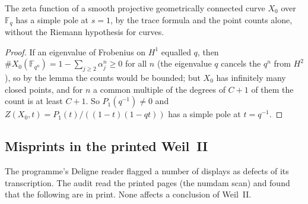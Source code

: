\begin{corollary}
The zeta function of a smooth projective geometrically connected curve $X_0$ over $\mathbb{F}_q$ has a simple pole at $s=1$, by the trace formula and the point counts alone, without the Riemann hypothesis for curves.
\end{corollary}

\begin{proof}
If an eigenvalue of Frobenius on $H^1$ equalled $q$, then $\#X_0(\mathbb{F}_{q^n})=1-\sum_{j\ge2}\alpha_j^n\ge0$ for all $n$ (the eigenvalue $q$ cancels the $q^n$ from $H^2$), so by the lemma the counts would be bounded; but $X_0$ has infinitely many closed points, and for $n$ a common multiple of the degrees of $C+1$ of them the count is at least $C+1$. So $P_1(q^{-1})\ne0$ and $Z(X_0,t)=P_1(t)/((1-t)(1-qt))$ has a simple pole at $t=q^{-1}$.
\end{proof}

\subsection{Misprints in the printed Weil~II}\label{ssec:misprints}

The programme's Deligne reader flagged a number of displays as defects of its transcription. The audit read the printed pages (the numdam scan) and found that the following are in print. None affects a conclusion of Weil~II.

